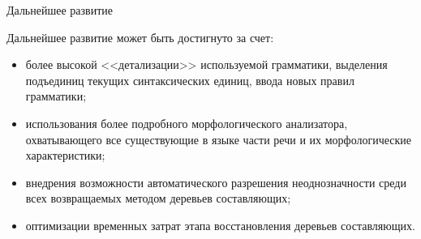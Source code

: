 \documentclass[8pt, aspectratio=169]{beamer}
\begin{document}
	\begin{frame}{\centering Дальнейшее развитие}
		
		Дальнейшее развитие может быть достигнуто за счет:
		\begin{itemize}
			\item[---] более высокой <<детализации>> используемой грамматики, выделения подъединиц текущих синтаксических единиц, ввода новых правил грамматики;
			\item[---] использования более подробного морфологического анализатора, охватывающего все существующие в языке части речи и их морфологические характеристики;
			\item[---] внедрения возможности автоматического разрешения неоднозначности среди всех возвращаемых методом деревьев составляющих;
			\item[---] оптимизации временных затрат этапа восстановления деревьев составляющих.
		\end{itemize}
	\end{frame}
	
	
\end{document}
